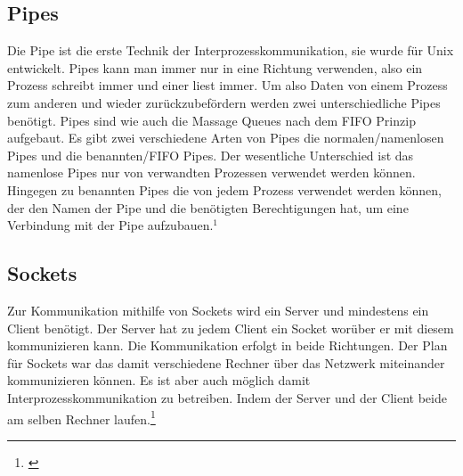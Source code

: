 \subsection{Pipes}
Die Pipe ist die erste Technik der Interprozesskommunikation, sie wurde für Unix entwickelt. Pipes kann man immer nur in eine Richtung verwenden, also ein Prozess schreibt immer und einer liest immer.  Um also Daten von einem Prozess zum anderen und wieder zurückzubefördern werden zwei unterschiedliche Pipes benötigt. Pipes sind wie auch die Massage Queues nach dem FIFO Prinzip aufgebaut. Es gibt zwei verschiedene Arten von Pipes die normalen/namenlosen Pipes und die benannten/FIFO Pipes. Der wesentliche Unterschied ist das namenlose Pipes nur von verwandten Prozessen verwendet werden können. Hingegen zu benannten Pipes die von jedem Prozess verwendet werden können, der den Namen der Pipe und die benötigten Berechtigungen hat, um eine Verbindung mit der Pipe aufzubauen.$^{1}$

\subsection{Sockets}
Zur Kommunikation mithilfe von Sockets wird ein Server und mindestens ein Client benötigt. Der Server hat  zu jedem Client ein Socket worüber er mit diesem kommunizieren kann. Die Kommunikation erfolgt in beide Richtungen. Der Plan für Sockets war das damit verschiedene Rechner über das Netzwerk miteinander kommunizieren können. Es ist aber auch möglich damit Interprozesskommunikation zu betreiben. Indem der Server und der Client beide am selben Rechner laufen.\footnote[1]{\cite[Vgl.][]{30}}